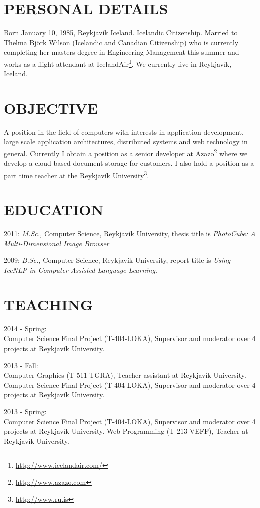 \documentclass[margin]{res}
\begin{document}
\begin{resume} 
\section{PERSONAL DETAILS}
Born January 10, 1985, Reykjavík Iceland. Icelandic Citizenship. Married to
Thelma Björk Wilson (Icelandic and Canadian Citizenship) who is currently
completing her masters degree in Engineering Management this summer and works
as a flight attendant at IcelandAir\footnote{\url{http://www.icelandair.com/}}.
We currently live in Reykjavík, Iceland.

\section{OBJECTIVE}  
A position in the field of computers with interests in application development,
large scale application architectures, distributed systems and web technology
in general. Currently I obtain a position as a senior developer at
Azazo\footnote{\url{http://www.azazo.com}} where we develop a cloud based
document storage for customers. I also hold a position as a part time teacher
at the Reykjavík University\footnote{\url{http://www.ru.is}}.

\section{EDUCATION}
2011: \emph{M.Sc.,} Computer Science, Reykjavík University, thesis title is
\emph{PhotoCube: A Multi-Dimensional Image Browser}

2009: \emph{B.Sc.,}
Computer Science, Reykjavík University, report title is \emph{Using IceNLP in
Computer-Assisted Language Learning.} 

\section{TEACHING}
2014 - Spring:\\
Computer Science Final Project (T-404-LOKA), Supervisor and moderator over 4
projects at Reykjavík University.

2013 - Fall:\\ 
Computer Graphics (T-511-TGRA), Teacher assistant at Reykjavík University.
Computer Science Final Project (T-404-LOKA), Supervisor and moderator over 4
projects at Reykjavík University.

2013 - Spring:\\ 
Computer Science Final Project (T-404-LOKA), Supervisor and moderator over 4
projects at Reykjavík University. Web Programming (T-213-VEFF), Teacher at
Reykjavík University.


\end{resume}
\end{document}
